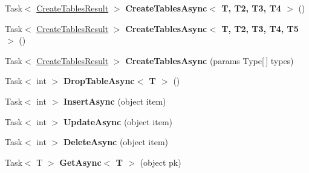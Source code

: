 \begin{DoxyCompactItemize}
\item 
\hypertarget{classSQLite_1_1SQLiteAsyncConnection_a36ed358566d4c64e0bf524c7d8c681a4}{Task$<$ \hyperlink{classSQLite_1_1CreateTablesResult}{Create\-Tables\-Result} $>$ {\bfseries Create\-Tables\-Async$<$ T, T2, T3, T4 $>$} ()}\label{classSQLite_1_1SQLiteAsyncConnection_a36ed358566d4c64e0bf524c7d8c681a4}

\item 
\hypertarget{classSQLite_1_1SQLiteAsyncConnection_a9b3c8584432d04508c89aebbbb1fedea}{Task$<$ \hyperlink{classSQLite_1_1CreateTablesResult}{Create\-Tables\-Result} $>$ {\bfseries Create\-Tables\-Async$<$ T, T2, T3, T4, T5 $>$} ()}\label{classSQLite_1_1SQLiteAsyncConnection_a9b3c8584432d04508c89aebbbb1fedea}

\item 
\hypertarget{classSQLite_1_1SQLiteAsyncConnection_af98ef3fd9628a9cda7b2b0532291f04b}{Task$<$ \hyperlink{classSQLite_1_1CreateTablesResult}{Create\-Tables\-Result} $>$ {\bfseries Create\-Tables\-Async} (params Type\mbox{[}$\,$\mbox{]} types)}\label{classSQLite_1_1SQLiteAsyncConnection_af98ef3fd9628a9cda7b2b0532291f04b}

\item 
\hypertarget{classSQLite_1_1SQLiteAsyncConnection_a6781339fb664cde6494460e686f5cb60}{Task$<$ int $>$ {\bfseries Drop\-Table\-Async$<$ T $>$} ()}\label{classSQLite_1_1SQLiteAsyncConnection_a6781339fb664cde6494460e686f5cb60}

\item 
\hypertarget{classSQLite_1_1SQLiteAsyncConnection_a7c621805c4f3185e9b064288b2b47d4a}{Task$<$ int $>$ {\bfseries Insert\-Async} (object item)}\label{classSQLite_1_1SQLiteAsyncConnection_a7c621805c4f3185e9b064288b2b47d4a}

\item 
\hypertarget{classSQLite_1_1SQLiteAsyncConnection_a3950c4feb7a8d2964a42167d8a4516a0}{Task$<$ int $>$ {\bfseries Update\-Async} (object item)}\label{classSQLite_1_1SQLiteAsyncConnection_a3950c4feb7a8d2964a42167d8a4516a0}

\item 
\hypertarget{classSQLite_1_1SQLiteAsyncConnection_ac34ee6c331f35dc8cbb73a0373315fb0}{Task$<$ int $>$ {\bfseries Delete\-Async} (object item)}\label{classSQLite_1_1SQLiteAsyncConnection_ac34ee6c331f35dc8cbb73a0373315fb0}

\item 
\hypertarget{classSQLite_1_1SQLiteAsyncConnection_a59792569de902bd2e87b967a35154d4c}{Task$<$ T $>$ {\bfseries Get\-Async$<$ T $>$} (object pk)}\label{classSQLite_1_1SQLiteAsyncConnection_a59792569de902bd2e87b967a35154d4c}


\end{DoxyCompactItemize}
